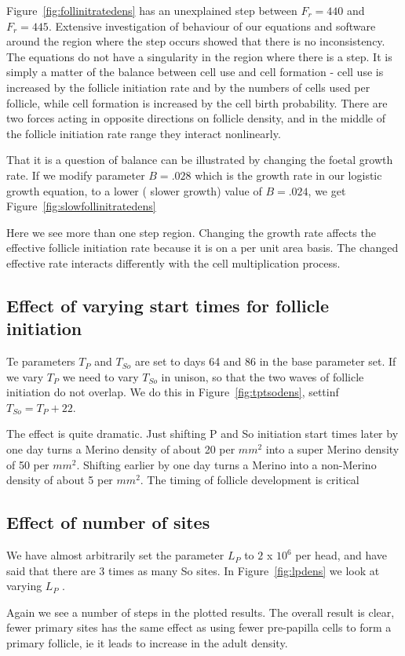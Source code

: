 \documentclass[titlepage]{article}  %
\begin{document}
Figure~\ref{fig:follinitratedens} has an unexplained step between $F_{r}=440$ and $F_{r}=445$.  Extensive investigation of behaviour of our equations and software around the region where the step occurs showed that there is no inconsistency. The equations do not have a singularity in the region where there is a step. It is simply a matter of the balance between cell use and cell formation - cell use is increased by the follicle initiation rate and by the numbers of cells used per follicle, while cell formation is increased by the cell birth probability.  There are two forces acting in opposite directions on follicle density, and in the middle of the follicle initiation rate range they interact nonlinearly.

That it is a question of balance can be illustrated by changing the foetal growth rate. If we modify parameter $B=.028$ which is the growth rate in our logistic growth equation, to a lower ( slower growth) value of $B=.024$, we get Figure~\ref{fig:slowfollinitratedens}

Here we see more than one step region. Changing the growth rate affects the effective follicle initiation rate because it is on a per unit area basis. The changed  effective rate interacts differently with the cell multiplication process.

\subsection{Effect of varying start times for follicle initiation}
Te parameters $T_{P}$ and $T_{So}$  are set to days 64 and 86 in the base parameter set. If we vary $T_{P}$ we need to vary $T_{So}$ in unison, so that the two waves of follicle initiation do not overlap.  We do this in Figure~\ref{fig:tptsodens}, settinf $T_{So} = T_{P} + 22 $. 

The effect is quite dramatic. Just shifting P and So initiation start times later by one day turns a Merino density of about 20 per $mm^{2}$ into a super Merino density of 50 per $mm^{2}$. Shifting earlier by one day turns a Merino into a non-Merino density of about 5 per $mm^{2}$. The timing of follicle development is critical

\subsection{Effect of number of sites}
We have almost arbitrarily set the parameter $L_{P}$ to $2$ x $10^{6}$ per head, and have said that there are 3 times as many So sites. In Figure~\ref{fig:lpdens} we look at varying $L_{P}$ . 

Again we see a number of steps in the  plotted results. The overall result is clear, fewer primary sites has the same effect as using fewer pre-papilla cells to form a primary follicle, ie it leads to increase in the adult density.
\end{document}
